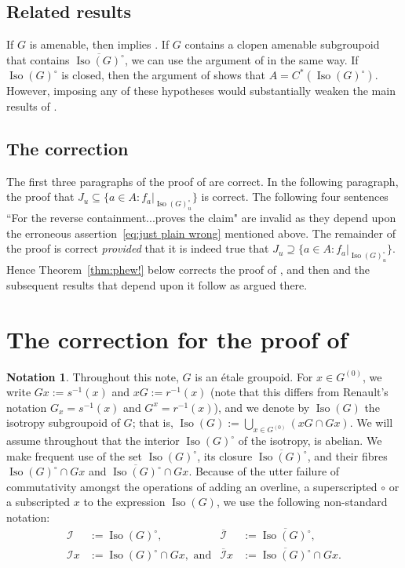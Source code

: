 \documentclass[a4paper, 12pt]{amsart}
\theoremstyle{plain}
\theoremstyle{definition}
\newtheorem{notation}[theorem]{Notation}
\theoremstyle{remark}
\newcommand{\Iso}{\operatorname{Iso}}
\newcommand{\Ii}{\mathcal{I}}
\newcommand{\Iicl}{\overline{\mathcal{I}}}
\numberwithin{equation}{section}
\begin{document}
\subsection*{Related results}
If $G$ is amenable, then \cite[Theorem~4.2]{BEFPR} implies
\cite[Corollary~5.3]{CRST}. If $G$ contains
a clopen amenable subgroupoid that
contains $\overline{\Iso(G)^\circ}$, we can use the argument of
\cite[Theorem~4.2]{BEFPR} in the same way. If $\Iso(G)^\circ$ is closed, then
the argument of \cite[Proposition~3.12]{DWZ} shows that $A =
C^*(\Iso(G)^\circ)$. However, imposing any of these hypotheses would
substantially weaken the main results of \cite{CRST}.

\subsection*{The correction}
The first three paragraphs of the proof of \cite[Lemma~5.2]{CRST} are correct. In the following paragraph,
the proof that $J_u \subseteq \{a \in A : f_a|_{\operatorname{Iso}(G)^\circ_u}\}$ is correct. The
following four sentences ``For the reverse containment...proves the claim" are invalid as they depend upon
the erroneous assertion~\eqref{eq:just plain wrong} mentioned above. The remainder of the proof is correct
\emph{provided} that it is indeed true that $J_u \supseteq \{a \in A : f_a|_{\operatorname{Iso}(G)^\circ_u}\}$.
Hence Theorem~\ref{thm:phew!} below corrects the proof of \cite[Lemma~5.2]{CRST}, and then \cite[Corollary~5.3]{CRST}
and the subsequent results that depend upon it follow as argued there.


\section{The correction for the proof of \cite[Lemma~5.2]{CRST}}

\begin{notation}
Throughout this note, $G$ is an \'etale groupoid.
For $x\in G^{(0)}$, we write $Gx:=s^{-1}(x)$ and $xG:=r^{-1}(x)$ (note that this differs from
Renault's notation $G_x = s^{-1}(x)$ and $G^x = r^{-1}(x)$),
and we denote by $\Iso(G)$ the isotropy subgroupoid of $G$; that is, $\Iso(G):=
\bigcup_{x \in G^{(0)}} (xG \cap Gx)$. We will assume throughout that the interior
$\Iso(G)^\circ$ of the isotropy, is abelian. We make frequent use
of the set $\Iso(G)^\circ$, its closure $\overline{\Iso(G)^\circ}$, and their
fibres $\Iso(G)^\circ \cap Gx$ and $\overline{\Iso(G)^\circ} \cap Gx$.
Because of the utter failure of commutativity amongst the operations of
adding an overline, a superscripted $\circ$ or a subscripted $x$ to the
expression $\Iso(G)$, we use the following non-standard notation:
\begin{align*}
\Ii &:= \Iso(G)^\circ, & \Iicl &:= \overline{\Iso(G)^\circ},\\
\Ii x &:= \Iso(G)^\circ \cap Gx,\text{ and} & \Iicl x &:= \overline{\Iso(G)^\circ} \cap Gx.
\end{align*}
\end{notation}
\end{document}

